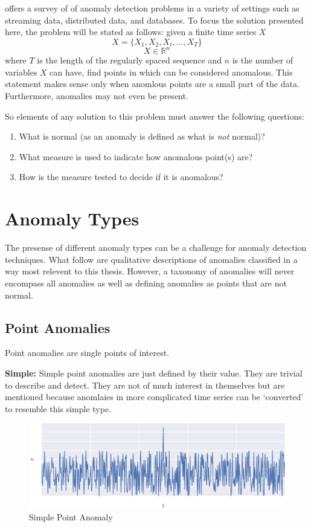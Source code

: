 \cite{Gupta2013} offers a survey of of anomaly detection problems in a variety of settings such as streaming data, distributed data, and databases. To focus the solution presented here, the problem will be stated as follows: given a finite time series $X$
 \[ X=\{X_1,X_2,X_t,\ldots,X_T\}\]
\[  X \in \mathbb{R}^n \]
where $T$ is the length of the regularly spaced sequence and $n$ is the number of variables $X$ can have, find points in which can be considered anomalous. This statement makes sense only when anomlous points are a small part of the data. Furthermore, anomalies may not even be present.

So elements of any solution to this problem must answer the following questions:

\begin{enumerate}
\item
What is normal (as an anomaly is defined as what is \textit{not} normal)?
\item
What measure is used to indicate how anomalous point(s) are?
\item
How is the measure tested to decide if it is anomalous?
\end{enumerate}



\section[adtypes]{Anomaly Types}

The presense of different anomaly types can be a challenge for anomaly detection techniques. What follow are qualitative descriptions of anomalies classified in a way most relevent to this thesis. However, a taxonomy of anomalies will never encompass all anomalies as well as defining anomalies as points that are not normal.

\subsection[ptanom]{Point Anomalies}

Point anomalies are single points of interest.

\textbf{Simple:} Simple point anomalies are just defined by their value. They are trivial to describe and detect. They are not of much interest in themselves but are mentioned because anomlaies in more complicated time series can be `converted' to resemble this simple type.

\begin{figure}[H]
  \centering
  \includegraphics{figs/trivial.pdf}
  \caption{Simple Point Anomaly}
\end{figure}


